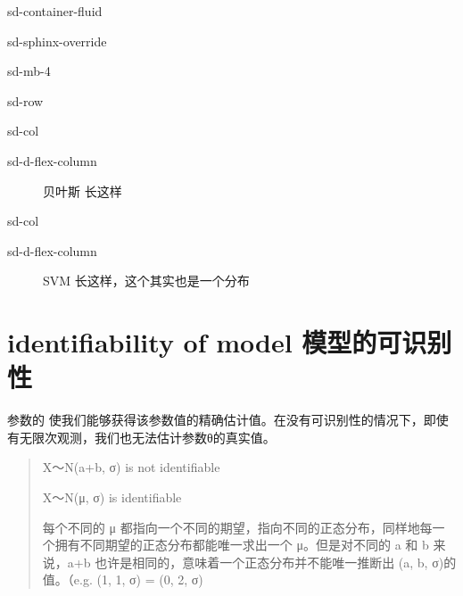 \documentclass[letterpaper,10pt,english]{sphinxmanual}
\begin{document}
\begin{sphinxuseclass}{sd-container-fluid}
\begin{sphinxuseclass}{sd-sphinx-override}
\begin{sphinxuseclass}{sd-mb-4}
\begin{sphinxuseclass}{sd-row}
\begin{sphinxuseclass}{sd-col}
\begin{sphinxuseclass}{sd-d-flex-column}
\begin{figure}[htbp]
\centering
\capstart

\noindent{}
\caption{贝叶斯 长这样}\label{\detokenize{AI/main:id13}}\end{figure}

\end{sphinxuseclass}
\end{sphinxuseclass}
\begin{sphinxuseclass}{sd-col}
\begin{sphinxuseclass}{sd-d-flex-column}
\begin{figure}[htbp]
\centering
\capstart

\noindent{}
\caption{SVM 长这样，这个其实也是一个分布}\label{\detokenize{AI/main:id14}}\end{figure}

\end{sphinxuseclass}
\end{sphinxuseclass}
\end{sphinxuseclass}
\end{sphinxuseclass}
\end{sphinxuseclass}
\end{sphinxuseclass}

\section{identifiability of model 模型的可识别性}
\label{\detokenize{AI/main:identifiability-of-model}}
\sphinxAtStartPar
{}

\sphinxAtStartPar
参数的  使我们能够获得该参数值的精确估计值。在没有可识别性的情况下，即使有无限次观测，我们也无法估计参数θ的真实值。
\begin{quote}

\begin{DUlineblock}{0em}
\item[] X～N(a+b, σ) is not identifiable
\item[] X～N(μ, σ) is identifiable
\item[] 每个不同的 μ 都指向一个不同的期望，指向不同的正态分布，同样地每一个拥有不同期望的正态分布都能唯一求出一个 μ。但是对不同的 a 和 b 来说，a+b 也许是相同的，意味着一个正态分布并不能唯一推断出 (a, b, σ)的值。（e.g. (1, 1, σ) = (0, 2, σ)
\end{DUlineblock}
\end{quote}
\end{document}
